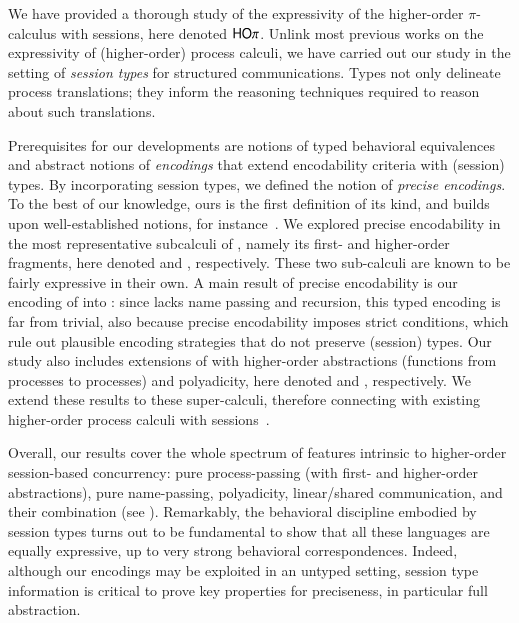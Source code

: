 
We have provided a thorough study of the expressivity of the higher-order $\pi$-calculus with sessions, here denoted $\mathsf{HO}\pi$.
Unlink most previous works on the expressivity of 
(higher-order) process calculi, we have carried out our study in the setting of \emph{session types} for structured communications.
Types not only delineate process translations; they 
inform the reasoning techniques required to reason about such translations.

Prerequisites for our developments are notions of typed behavioral equivalences and abstract notions of 
\emph{encodings} that extend encodability criteria with (session) types.
By incorporating session types, we defined the notion of \emph{precise  encodings}.
To the best of our knowledge, ours is the first definition of its kind, and builds upon well-established notions, for instance~\cite{DBLP:journals/iandc/Gorla10}. We explored precise encodability in the most representative subcalculi of \HOp, 
namely its first- and higher-order fragments, here denoted \sessp and \HO, respectively. These two sub-calculi are known to be fairly expressive in their own. A main result of precise encodability is our encoding of \HOp into \HO:
since \HO lacks name passing and recursion, this typed encoding is far from trivial, also because precise encodability imposes strict conditions, which rule out plausible encoding strategies that do not preserve (session) types. Our study also includes extensions of \HOp with higher-order abstractions (functions from processes to processes) and polyadicity, here denoted \HOpp and \PHOp, respectively. We extend these results to these super-calculi, therefore connecting with existing higher-order process calculi with sessions~\cite{tlca07}.

Overall, 
our results cover the whole spectrum of features intrinsic to higher-order session-based concurrency:
pure process-passing (with first- and higher-order abstractions), pure name-passing, polyadicity, 
linear/shared communication, and their combination (see ). Remarkably, 
the behavioral discipline embodied by 
session types turns out to be fundamental to show that all these languages are equally expressive, up to 
very strong behavioral correspondences. Indeed, although our encodings may be exploited in an untyped setting,
session type information is critical to prove key properties for preciseness, in particular full abstraction.
